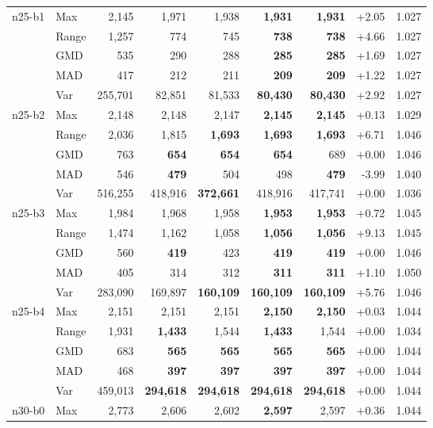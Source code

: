 \begin{small}
\begin{longtable}{llrrrrrrr}
n25-b1 & Max & 2,145 & 1,971 & 1,938 & \textbf{1,931} & \textbf{1,931} & +2.05 & 1.027 \\
 & Range & 1,257 & 774 & 745 & \textbf{738} & \textbf{738} & +4.66 & 1.027 \\
 & GMD & 535 & 290 & 288 & \textbf{285} & \textbf{285} & +1.69 & 1.027 \\
 & MAD & 417 & 212 & 211 & \textbf{209} & \textbf{209} & +1.22 & 1.027 \\
 & Var & 255,701 & 82,851 & 81,533 & \textbf{80,430} & \textbf{80,430} & +2.92 & 1.027 \\
n25-b2 & Max & 2,148 & 2,148 & 2,147 & \textbf{2,145} & \textbf{2,145} & +0.13 & 1.029 \\
 & Range & 2,036 & 1,815 & \textbf{1,693} & \textbf{1,693} & \textbf{1,693} & +6.71 & 1.046 \\
 & GMD & 763 & \textbf{654} & \textbf{654} & \textbf{654} & 689 & +0.00 & 1.046 \\
 & MAD & 546 & \textbf{479} & 504 & 498 & \textbf{479} & -3.99 & 1.040 \\
 & Var & 516,255 & 418,916 & \textbf{372,661} & 418,916 & 417,741 & +0.00 & 1.036 \\
n25-b3 & Max & 1,984 & 1,968 & 1,958 & \textbf{1,953} & \textbf{1,953} & +0.72 & 1.045 \\
 & Range & 1,474 & 1,162 & 1,058 & \textbf{1,056} & \textbf{1,056} & +9.13 & 1.045 \\
 & GMD & 560 & \textbf{419} & 423 & \textbf{419} & \textbf{419} & +0.00 & 1.046 \\
 & MAD & 405 & 314 & 312 & \textbf{311} & \textbf{311} & +1.10 & 1.050 \\
 & Var & 283,090 & 169,897 & \textbf{160,109} & \textbf{160,109} & \textbf{160,109} & +5.76 & 1.046 \\
n25-b4 & Max & 2,151 & 2,151 & 2,151 & \textbf{2,150} & \textbf{2,150} & +0.03 & 1.044 \\
 & Range & 1,931 & \textbf{1,433} & 1,544 & \textbf{1,433} & 1,544 & +0.00 & 1.034 \\
 & GMD & 683 & \textbf{565} & \textbf{565} & \textbf{565} & \textbf{565} & +0.00 & 1.044 \\
 & MAD & 468 & \textbf{397} & \textbf{397} & \textbf{397} & \textbf{397} & +0.00 & 1.044 \\
 & Var & 459,013 & \textbf{294,618} & \textbf{294,618} & \textbf{294,618} & \textbf{294,618} & +0.00 & 1.044 \\
n30-b0 & Max & 2,773 & 2,606 & 2,602 & \textbf{2,597} & 2,597 & +0.36 & 1.044 \\

\end{longtable}
\end{small}
